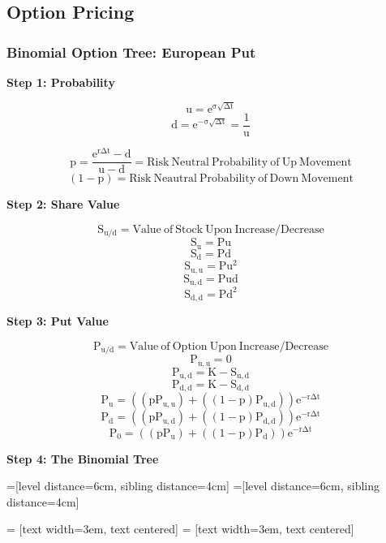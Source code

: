 \documentclass[11pt, english]{article}
\begin{document}
\newpage

	\subsection{Option Pricing}

		\subsubsection{Binomial Option Tree: European Put}

	\textbf{Step 1: Probability}

	$$\mathrm{u=e^{\sigma\sqrt{\Delta t}}}$$
	$$\mathrm{d=e^{-\sigma\sqrt{\Delta t}}=\frac{1}{u}}$$

	$$\mathrm{p=\frac{e^{r\Delta t}-d}{u-d}=Risk\ Neutral\ Probability\ of\ Up\ Movement}$$
	$$\mathrm{(1-p)=Risk\ Neautral\ Probability\ of\ Down\ Movement}$$

	\textbf{Step 2: Share Value}

	$$\mathrm{S_{u/d}=Value\ of\ Stock\ Upon\ Increase/Decrease}$$
	$$\mathrm{S_u=Pu}$$
	$$\mathrm{S_d=Pd}$$
	$$\mathrm{S_{u,u}=Pu^2}$$
	$$\mathrm{S_{u,d}=Pud}$$
	$$\mathrm{S_{d,d}=Pd^2}$$

	\textbf{Step 3: Put Value}

	$$\mathrm{P_{u/d}=Value\ of\ Option\ Upon\ Increase/Decrease}$$
	$$\mathrm{P_{u,u}=0}$$
	$$\mathrm{P_{u,d}=K-S_{u,d}}$$
	$$\mathrm{P_{d,d}=K-S_{d,d}}$$
	$$\mathrm{P_u=\left((pP_{u,u})+\left((1-p)P_{u,d}\right)\right)e^{-r\Delta t}}$$
	$$\mathrm{P_d=\left((pP_{u,d})+\left((1-p)P_{d,d}\right)\right)e^{-r\Delta t}}$$
	$$\mathrm{P_0=\left((pP_u)+\left((1-p)P_d\right)\right)e^{-r\Delta t}}$$

	\newpage

	\textbf{Step 4: The Binomial Tree}

	=[level distance=6cm, sibling distance=4cm]
	=[level distance=6cm, sibling distance=4cm]

	 = [text width=3em, text centered]
	 = [text width=3em, text centered]
\end{document}
